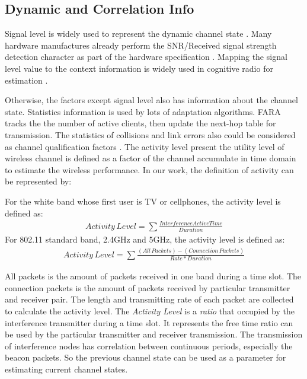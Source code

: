 \subsection{Dynamic and Correlation Info}

Signal level is widely used to represent the dynamic channel state  \cite{rahul2009frequency}. 
Many hardware manufactures already perform the SNR/Received signal strength detection character as part of the hardware specification \cite{edalat2006measured}. 
Mapping the signal level value to the context information is widely used in cognitive radio for estimation \cite{laneman2000energy,laneman2001efficient}. 

Otherwise, the factors except signal level also has information about the channel state. Statistics information is used by lots of adaptation algorithms.
FARA tracks the the number of active clients, then update the next-hop table for transmission\cite{rahul2009frequency}.
The statistics of collisions and link errors also could be considered as channel qualification factors \cite{pang2005rate}.
The activity level present the utility level of wireless channel is defined as a factor of the channel accumulate in time domain to estimate the wireless performance.
In our work, the definition of activity can be represented by:

For the white band whose first user is TV or cellphones, the activity level is defined as:
\begin{align}
\label{equation:non802 Activity Level}
Activity\,Level = \sum{\frac{Interference Active Time}{Duration}}
\end{align}
For 802.11 standard band, 2.4GHz and 5GHz, the activity level is defined as:
\begin{align}
\label{equation:802 Activity Level}
Activity\,Level = \sum{\frac{(All\, Packets)-(Connection\, Packets)}{Rate*Duration}}
\end{align}

All packets is the amount of packets received in one band during a time slot.
The connection packets is the amount of packets received by particular transmitter and receiver pair. 
The length and transmitting rate of each packet are collected to calculate the activity level.
The \emph{Activity Level} is a \emph{ratio} that occupied by the interference transmitter during a time slot. 
It represents the free time ratio can be used by the particular transmitter and receiver transmission. 
The transmission of interference nodes has correlation between continuous periods, especially the beacon packets. So the previous channel state can be used as a parameter for estimating current channel states.


